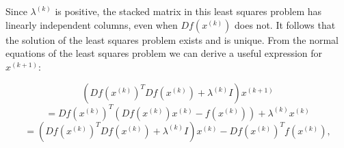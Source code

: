 Since \(\lambda^{(k)}\) is positive, the stacked matrix in this least squares problem has linearly independent columns, even when \(Df(x^{(k)})\) does not. It follows that the solution of the least squares problem exists and is unique. From the normal equations of the least squares problem we can derive a useful expression for \(x^{(k+1)}\):

\[\left(Df(x^{(k)})^{T}Df(x^{(k)})+\lambda^{(k)}I\right)x^{(k+1)}\] \[= Df(x^{(k)})^{T}\left(Df(x^{(k)})x^{(k)}-f(x^{(k)})\right)+\lambda ^{(k)}x^{(k)}\] \[= \left(Df(x^{(k)})^{T}Df(x^{(k)})+\lambda^{(k)}I\right)x^{(k)}-Df( x^{(k)})^{T}f(x^{(k)}),\]